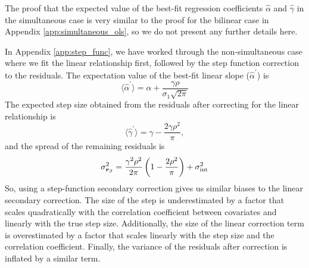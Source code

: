 The proof that the expected value of the best-fit regression coefficients $\hat{\alpha}$ and $\hat{\gamma}$ in the simultaneous case is very similar to the proof for the bilinear case in Appendix \ref{app:simultaneous_ols}, so we do not present any further details here.

In Appendix \ref{app:step_func}, we have worked through the non-simultaneous case where we fit the linear relationship first, followed by the step function correction to the residuals. The expectation value of the best-fit linear slope ($\hat{\alpha}^\prime$) is
\begin{equation}
    \langle\hat{\alpha}^\prime\rangle = \alpha + \frac{\gamma\rho}{\sigma_1\sqrt{2\pi}}
    \label{eqn:slope_inflation}
\end{equation}
The expected step size obtained from the residuals after correcting for the linear relationship is
\begin{equation}
    \langle\hat{\gamma}^\prime\rangle = \gamma - \frac{2\gamma\rho^2}{\pi},
    \label{eqn:step_deflation}
\end{equation}
and the spread of the remaining residuals is
\begin{equation}
    \sigma_{\bm{r}_\beta}^2 = \frac{\gamma^2\rho^2}{2\pi}\left(1-\frac{2\rho^2}{\pi}\right) + \sigma_{\text{int}}^2
\end{equation}
So, using a step-function secondary correction gives us similar biases to the linear secondary correction. The size of the step is underestimated by a factor that scales quadratically with the correlation coefficient between covariates and linearly with the true step size. Additionally, the size of the linear correction term is overestimated by a factor that scales linearly with the step size and the correlation coefficient. Finally, the variance of the residuals after correction is inflated by a similar term.

